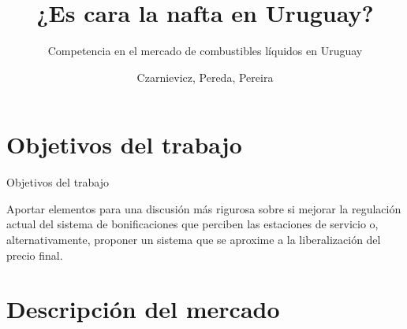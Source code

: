 \documentclass[10pt]{beamer}
\author{Czarnievicz, Pereda, Pereira}
\title []{¿Es cara la nafta en Uruguay?}
\subtitle []{Competencia en el mercado de combustibles líquidos en Uruguay}
\date{}
\institute []{Organización Industrial, FCEA - UdelaR}
\begin{document}
\maketitle
\begin{frame}
\tableofcontents
\end{frame}


\section{Objetivos del trabajo}

\begin{frame}{Objetivos del trabajo}

Aportar elementos para una discusión más rigurosa sobre si mejorar la regulación actual del sistema de bonificaciones que perciben las estaciones de servicio o, alternativamente, proponer un sistema que se aproxime a la liberalización del precio final.

\end{frame}


\section{Descripción del mercado}
\end{document}
